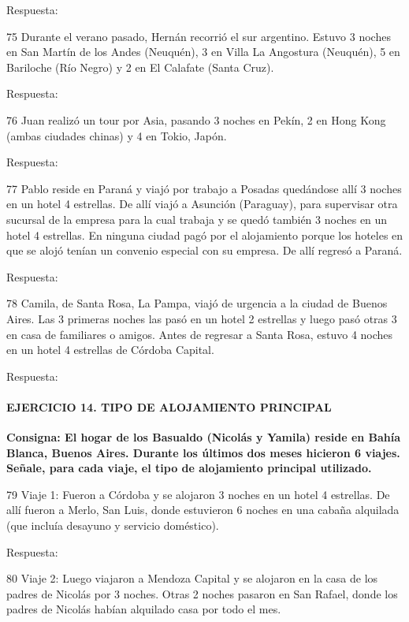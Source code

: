 \documentclass[
  openany]{book}
\begin{document}
Respuesta:

75 Durante el verano pasado, Hernán recorrió el sur argentino. Estuvo 3 noches en San Martín de los Andes (Neuquén), 3 en Villa La Angostura (Neuquén), 5 en Bariloche (Río Negro) y 2 en El Calafate (Santa Cruz).

Respuesta:

76 Juan realizó un tour por Asia, pasando 3 noches en Pekín, 2 en Hong Kong (ambas ciudades chinas) y 4 en Tokio, Japón.

Respuesta:

77 Pablo reside en Paraná y viajó por trabajo a Posadas quedándose allí 3 noches en un hotel 4 estrellas. De allí viajó a Asunción (Paraguay), para supervisar otra sucursal de la empresa para la cual trabaja y se quedó también 3 noches en un hotel 4 estrellas. En ninguna ciudad pagó por el alojamiento porque los hoteles en que se alojó tenían un convenio especial con su empresa. De allí regresó a Paraná.

Respuesta:

78 Camila, de Santa Rosa, La Pampa, viajó de urgencia a la ciudad de Buenos Aires. Las 3 primeras noches las pasó en un hotel 2 estrellas y luego pasó otras 3 en casa de familiares o amigos. Antes de regresar a Santa Rosa, estuvo 4 noches en un hotel 4 estrellas de Córdoba Capital.

Respuesta:

\hypertarget{ejercicio-14.-tipo-de-alojamiento-principal}{%
\paragraph{\texorpdfstring{\textbf{EJERCICIO 14. TIPO DE ALOJAMIENTO PRINCIPAL}}{EJERCICIO 14. TIPO DE ALOJAMIENTO PRINCIPAL}}\label{ejercicio-14.-tipo-de-alojamiento-principal}}

\textbf{Consigna: El hogar de los Basualdo (Nicolás y Yamila) reside en Bahía Blanca, Buenos Aires. Durante los últimos dos meses hicieron 6 viajes. Señale, para cada viaje, el tipo de alojamiento principal utilizado.}

79 Viaje 1: Fueron a Córdoba y se alojaron 3 noches en un hotel 4 estrellas. De allí fueron a Merlo, San Luis, donde estuvieron 6 noches en una cabaña alquilada (que incluía desayuno y servicio doméstico).

Respuesta:

80 Viaje 2: Luego viajaron a Mendoza Capital y se alojaron en la casa de los padres de Nicolás por 3 noches. Otras 2 noches pasaron en San Rafael, donde los padres de Nicolás habían alquilado casa por todo el mes.
\end{document}
